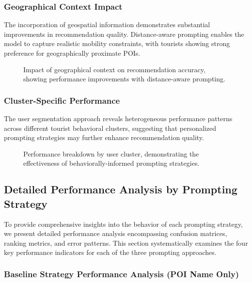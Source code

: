 \documentclass[12pt,a4paper]{article}
\begin{document}
\subsubsection{Geographical Context Impact}

The incorporation of geospatial information demonstrates substantial improvements in recommendation quality. Distance-aware prompting enables the model to capture realistic mobility constraints, with tourists showing strong preference for geographically proximate POIs.

\begin{figure}[h]
\centering
\caption{Impact of geographical context on recommendation accuracy, showing performance improvements with distance-aware prompting.}
\label{fig:geographical_impact}
\end{figure}

\subsubsection{Cluster-Specific Performance}

The user segmentation approach reveals heterogeneous performance patterns across different tourist behavioral clusters, suggesting that personalized prompting strategies may further enhance recommendation quality.

\begin{figure}[h]
\centering
\caption{Performance breakdown by user cluster, demonstrating the effectiveness of behaviorally-informed prompting strategies.}
\label{fig:cluster_performance}
\end{figure}

\subsection{Detailed Performance Analysis by Prompting Strategy}

To provide comprehensive insights into the behavior of each prompting strategy, we present detailed performance analysis encompassing confusion matrices, ranking metrics, and error patterns. This section systematically examines the four key performance indicators for each of the three prompting approaches.

\subsubsection{Baseline Strategy Performance Analysis (POI Name Only)}
\end{document}
